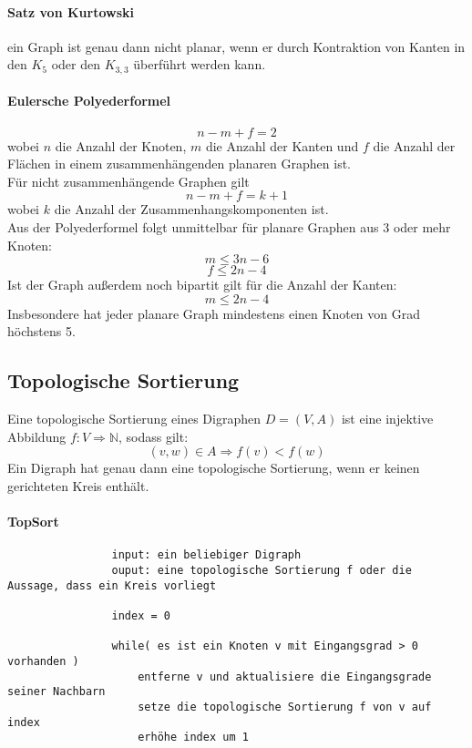 \documentclass[10pt,a4paper,landscape]{article}
\begin{document}
\begin{multicols*}{3}
            \paragraph*{ Satz von Kurtowski } ein Graph ist genau dann nicht planar, wenn er durch Kontraktion von Kanten 
            in den $K_5$ oder den $K_{3,3}$ überführt werden kann.
            \paragraph*{ Eulersche Polyederformel }
            \[ n - m + f = 2 \]
            wobei $n$ die Anzahl der Knoten, $m$ die Anzahl der Kanten und $f$ die Anzahl der Flächen in einem 
            zusammenhängenden planaren Graphen ist. \\
            Für nicht zusammenhängende Graphen gilt
            \[ n - m + f = k + 1 \]
            wobei $k$ die Anzahl der Zusammenhangskomponenten ist. \\
            Aus der Polyederformel folgt unmittelbar für planare Graphen aus 3 oder mehr Knoten:
            \[ m \leq 3n - 6 \]
            \[ f \leq 2n - 4 \]
            Ist der Graph außerdem noch bipartit gilt für die Anzahl der Kanten:
            \[ m \leq 2n - 4 \]
            Insbesondere hat jeder planare Graph mindestens einen Knoten von Grad höchstens 5.

            \subsection{ Topologische Sortierung }
            Eine topologische Sortierung eines Digraphen $D = (V,A)$ ist eine injektive Abbildung 
            $f:V\Rightarrow \mathbb{N}$, sodass gilt:
            \[ (v,w)\in A \Rightarrow f(v) < f(w) \]
            Ein Digraph hat genau dann eine topologische Sortierung, wenn er keinen gerichteten Kreis enthält.
            \paragraph*{ TopSort }
            \begin{verbatim}
                input: ein beliebiger Digraph
                ouput: eine topologische Sortierung f oder die Aussage, dass ein Kreis vorliegt

                index = 0

                while( es ist ein Knoten v mit Eingangsgrad > 0 vorhanden )
                    entferne v und aktualisiere die Eingangsgrade seiner Nachbarn
                    setze die topologische Sortierung f von v auf index
                    erhöhe index um 1


\end{verbatim}
\end{multicols*}
\end{document}
